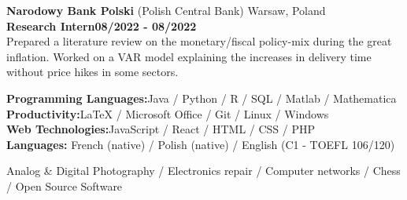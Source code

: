 \noindent\textbf{Narodowy Bank Polski} (Polish Central Bank) \hfill Warsaw, Poland\\[0.1cm]
\textbf{Research Intern}\hfill \textbf{08/2022  - 08/2022} \\
Prepared a literature review on the monetary/fiscal policy-mix during the great inflation. Worked on a VAR model explaining the increases in delivery time without price hikes in some sectors. 


	\begin{flushleft}
	\raisebox{-.6ex}{SKILLS} \hrulefill
	\end{flushleft}



  \noindent\textbf{Programming Languages:}\hfill{Java / Python / R / SQL / Matlab / Mathematica} \\
  \textbf{Productivity:}\hfill LaTeX / Microsoft Office / Git / Linux / Windows\\
  \textbf{Web Technologies:}\hfill JavaScript / React / HTML / CSS / PHP  \\
  \textbf{Languages:} \hfill French (native) / Polish (native) / English (C1 - TOEFL 106/120) 

	\begin{flushleft}
	\raisebox{-.6ex}{INTERESTS} \hrulefill
	\end{flushleft}

\noindent Analog \& Digital Photography / Electronics repair / Computer networks  / Chess / Open Source Software